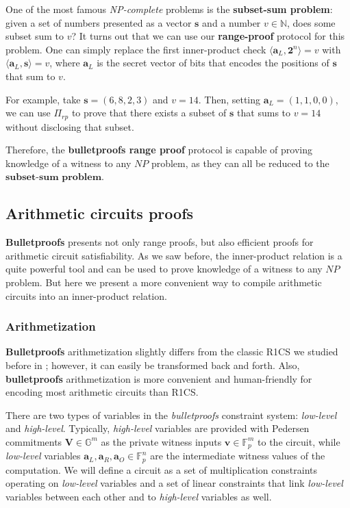 \documentclass[../lecture-notes-148x210.tex]{subfiles}
\begin{document}
\begin{example}
    One of the most famous \textit{NP-complete} problems is the \textbf{subset-sum problem}: given a set of numbers presented as a vector $\mathbf{s}$ and a number $v \in \mathbb{N}$, does some subset sum to $v$? It turns out that we can use our \textbf{range-proof} protocol for this problem. One can simply replace the first inner-product check $\langle \mathbf{a}_L, \mathbf{2}^n \rangle = v$ with $\langle \mathbf{a}_L, \mathbf{s} \rangle = v$, where $\mathbf{a}_L$ is the secret vector of bits that encodes the positions of $\mathbf{s}$ that sum to $v$.

    For example, take $\mathbf{s} = (6,8,2,3)$ and $v = 14$. Then, setting $\mathbf{a}_L = (1,1,0,0)$, we can use $\Pi_{rp}$ to prove that there exists a subset of $\mathbf{s}$ that sums to $v=14$ without disclosing that subset.

    Therefore, the \textbf{bulletproofs range proof} protocol is capable of proving knowledge of a witness to any $NP$ problem, as they can all be reduced to the $\textbf{subset-sum problem}$.
\end{example}
\subsection{Arithmetic circuits proofs}\label{subsection:bulletproofs-arithmetic-circuits}

\textbf{Bulletproofs} presents not only range proofs, but also efficient proofs for arithmetic circuit satisfiability. As we saw before, the inner-product relation is a quite powerful tool and can be used to prove knowledge of a witness to any $NP$ problem. But here we present a more convenient way to compile arithmetic circuits into an inner-product relation.

\subsubsection{Arithmetization}

\textbf{Bulletproofs} arithmetization slightly differs from the classic R1CS we studied before in ; however, it can easily be transformed back and forth. Also, \textbf{bulletproofs} arithmetization is more convenient and human-friendly for encoding most arithmetic circuits than R1CS.

There are two types of variables in the \textit{bulletproofs} constraint system: \textit{low-level} and \textit{high-level}. Typically, \textit{high-level} variables are provided with Pedersen commitments $\mathbf{V} \in \mathbb{G}^m$ as the private witness inputs $\mathbf{v} \in \mathbb{F}_p^m$ to the circuit, while \textit{low-level} variables $\mathbf{a}_L, \mathbf{a}_R, \mathbf{a}_O \in \mathbb{F}_p^n$ are the intermediate witness values of the computation. We will define a circuit as a set of multiplication constraints operating on \textit{low-level} variables and a set of linear constraints that link \textit{low-level} variables between each other and to \textit{high-level} variables as well.
\end{document}
